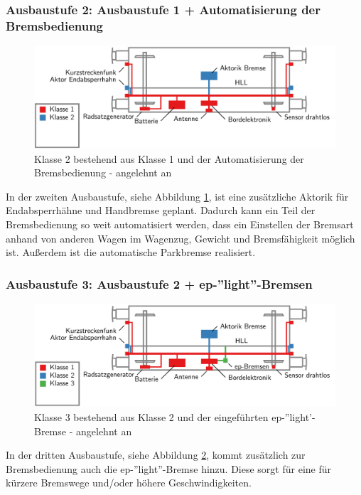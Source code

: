 \subsubsection{Ausbaustufe 2: Ausbaustufe 1 + Automatisierung der Bremsbedienung}
\begin{figure}[htbp] 
    \includegraphics[width=\textwidth]{Bilder/Ausbaustufen_2.PNG}
    \caption{Klasse 2 bestehend aus Klasse 1 und der Automatisierung der Bremsbedienung - angelehnt an \cite{ETR_3}}
    \label{fig:Klasse2}
\end{figure} 
In der zweiten Ausbaustufe, siehe Abbildung \ref{fig:Klasse2}, ist eine zusätzliche Aktorik für Endabsperrhähne und Handbremse geplant. Dadurch kann ein Teil der Bremsbedienung so weit automatisiert werden, dass ein Einstellen der Bremsart anhand von anderen Wagen im Wagenzug, Gewicht und Bremsfähigkeit möglich ist. Außerdem ist die automatische Parkbremse realisiert.\par
\subsubsection{Ausbaustufe 3: Ausbaustufe 2 + ep-''light''-Bremsen}
\begin{figure}[htbp] 
    \includegraphics[width=\textwidth]{Bilder/Ausbaustufen_3.PNG}
    \caption{Klasse 3 bestehend aus Klasse 2 und der eingeführten ep-''light'-Bremse - angelehnt an \cite{ETR_3}}
    \label{fig:Klasse3}
\end{figure} 
In der dritten Ausbaustufe, siehe Abbildung \ref{fig:Klasse3}, kommt zusätzlich zur Bremsbedienung auch die ep-''light''-Bremse hinzu. Diese sorgt für eine für kürzere Bremswege und/oder höhere Geschwindigkeiten.\par
